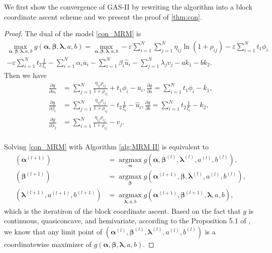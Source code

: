 \documentclass[review,hidelinks,onefignum,onetabnum]{siamart220329}
\begin{document}
We first show the convergence of GAS-II by rewriting the algorithm into a block coordinate ascent scheme and we present the proof of \cref{thm:con}.
\begin{proof}
The dual of the model \cref{con_MRM} is
\begin{multline}\label{con_dual2}
    \max_{\bm{\alpha},\bm{\beta},\bm{\lambda},a,b} g(\bm{\alpha},\bm{\beta},\bm{\lambda},a,b)
  =\max_{\bm{\alpha},\bm{\beta},\bm{\lambda},a,b}  -\varepsilon \sum_{i=1}^{N}\sum_{j=1}^{N} \eta_{ij}\ln(1+\rho_{ij})-\varepsilon \sum_{i=1}^{N} t_1 \phi_{i}\\
  -\varepsilon \sum_{i=1}^{N} t_2 \frac{1}{\xi_{i}} - \sum_{i=1}^{N} \alpha_{i} \overline{u}_i- \sum_{i=1}^{N} \beta_{i} \hat{u}_i-\sum_{j=1}^{N}\lambda_jv_j -ak_1 -b k_2. 
\end{multline}
Then we have 
\begin{equation}\label{con_partial}
	\begin{aligned}
	\frac{\partial g}{\partial\alpha_{i}}&=\sum_{j=1}^{N}\frac{ \eta_{ij}\rho_{ij}}{1+\rho_{ij}}+t_1 \phi_i-\overline{u}_i,
    \frac{\partial g}{\partial a}=\sum_{i=1}^{N} t_1 \phi_i-k_1, \\
	\frac{\partial g}{\partial \beta_i}&=\sum_{j=1}^{N}\frac{ \eta_{ij}\rho_{ij}}{1+\rho_{ij}}-t_2 \frac{1}{\xi_i}-\hat{u}_i,
    \frac{\partial g}{\partial b}=\sum_{i=1}^{N} t_2 \frac{1}{\xi_i}-k_2,\\
	\frac{\partial g}{\partial \lambda_j}&=\sum_{i=1}^{N}\frac{ \eta_{ij}\rho_{ij}}{1+\rho_{ij}}-v_j.\\
	\end{aligned}
\end{equation}

Solving \cref{con_MRM} with Algorithm \ref{alg:MRM II} is equivalent to
\begin{equation}\label{con_iter}
	\begin{aligned}
	(\bm{\alpha}^{(l+1)})&=\mathop{\mathrm{argmax}}\limits_{\bm{\alpha}}  g(\bm{\alpha},\bm{\beta}^{(l)},\bm{\lambda}^{(l)},a^{(l)},b^{(l)}),\\
	(\bm{\beta}^{(l+1)})&=\mathop{\mathrm{argmax}}\limits_{\bm{\beta}}  g(\bm{\alpha}^{(l+1)},\bm{\beta},\bm{\lambda}^{(l)},a^{(l)},b^{(l)}),\\
	(\bm{\lambda}^{(l+1)},a^{(l+1)}, b^{(l+1)})&=\mathop{\mathrm{argmax}}\limits_{\bm{\lambda},a ,b}  g(\bm{\alpha}^{(l+1)},\bm{\beta}^{(l+1)},\bm{\lambda},a,b),
	\end{aligned}
\end{equation}
which is the iteratiron of the block coordinate ascent. 
Based on the fact that $g$ is continuous,
quasiconcave, and hemivariate, according to the Proposition 5.1 of \cite{tseng2001convergence}, we know that any limit point of
$\left(\bm{\alpha}^{(l)},\bm{\beta}^{(l)},\bm{\lambda}^{(l)},a^{(l)},b^{(l)}\right)$ is a coordinatewise maximizer of $g(\bm{\alpha},\bm{\beta},\bm{\lambda},a,b)$.
\end{proof}
\end{document}
